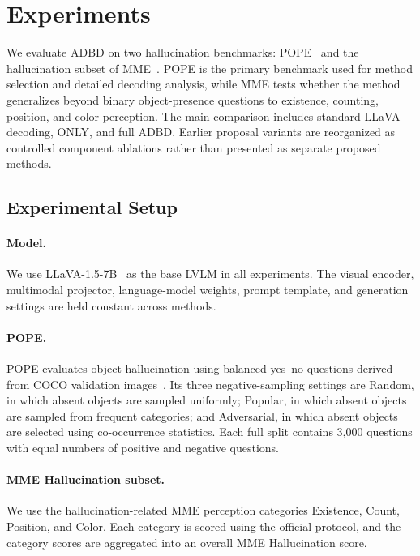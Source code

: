 \section{Experiments}
\label{sec:experiments}

We evaluate ADBD on two hallucination benchmarks: POPE~\cite{li2023pope} and the hallucination subset of MME~\cite{fu2023mme}. POPE is the primary benchmark used for method selection and detailed decoding analysis, while MME tests whether the method generalizes beyond binary object-presence questions to existence, counting, position, and color perception. The main comparison includes standard LLaVA decoding, ONLY, and full ADBD. Earlier proposal variants are reorganized as controlled component ablations rather than presented as separate proposed methods.

\subsection{Experimental Setup}

\paragraph{Model.}
We use LLaVA-1.5-7B~\cite{liu2024visual} as the base LVLM in all experiments. The visual encoder, multimodal projector, language-model weights, prompt template, and generation settings are held constant across methods.

\paragraph{POPE.}
POPE evaluates object hallucination using balanced yes--no questions derived from COCO validation images~\cite{lin2014microsoft}. Its three negative-sampling settings are Random, in which absent objects are sampled uniformly; Popular, in which absent objects are sampled from frequent categories; and Adversarial, in which absent objects are selected using co-occurrence statistics. Each full split contains 3,000 questions with equal numbers of positive and negative questions. 

\paragraph{MME Hallucination subset.}
We use the hallucination-related MME perception categories Existence, Count, Position, and Color. Each category is scored using the official protocol, and the category scores are aggregated into an overall MME Hallucination score. 

